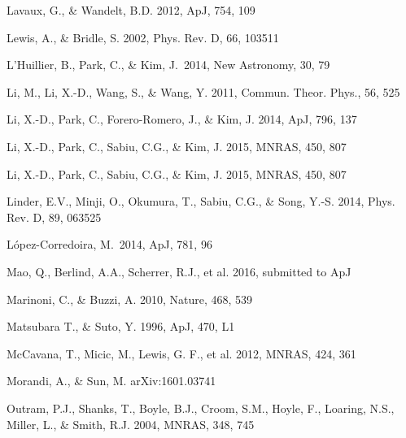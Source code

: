 \documentclass[useAMS,usenatbib]{mnras}
\begin{document}
\begin{thebibliography}{}
Lavaux, G., \& Wandelt, B.D. 2012, ApJ, 754, 109  


Lewis, A., \& Bridle, S. 2002, Phys. Rev. D, 66, 103511

L'Huillier, B., Park, C., \& Kim, J.\ 2014, New Astronomy, 30, 79 

Li, M., Li, X.-D., Wang, S., \& Wang, Y. 2011, Commun. Theor. Phys., 56, 525

Li, X.-D., Park, C., Forero-Romero, J., \& Kim, J. 2014, ApJ, 796, 137

Li, X.-D., Park, C., Sabiu, C.G., \& Kim, J. 2015, MNRAS, 450, 807 

Li, X.-D., Park, C., Sabiu, C.G., \& Kim, J. 2015, MNRAS, 450, 807 


Linder, E.V., Minji, O., Okumura, T., Sabiu, C.G., \& Song, Y.-S. 2014, Phys. Rev. D, 89, 063525  

L{\'o}pez-Corredoira, M.\ 2014, ApJ, 781, 96 

Mao, Q., Berlind, A.A., Scherrer, R.J., et al. 2016, submitted to ApJ

Marinoni, C., \& Buzzi, A. 2010, Nature, 468, 539  

Matsubara T., \& Suto, Y. 1996, ApJ, 470, L1  

McCavana, T., Micic, M., Lewis, G. F., et al. 2012, MNRAS, 424, 361


Morandi, A., \& Sun, M. arXiv:1601.03741


Outram, P.J., Shanks, T., Boyle, B.J., Croom, S.M., Hoyle, F., Loaring, N.S., 
Miller, L., \& Smith, R.J. 2004, MNRAS, 348, 745  



\end{thebibliography}
\end{document}
